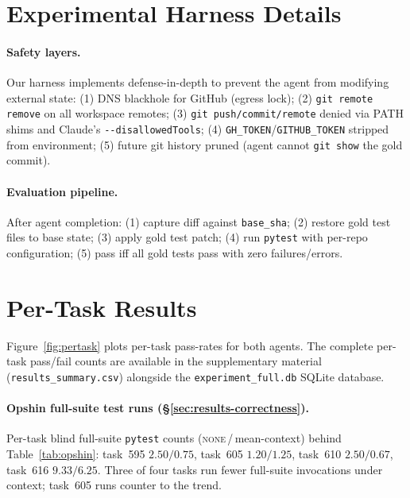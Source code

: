 \documentclass[11pt]{article}
\newcommand{\none}{\textsc{none}}
\begin{document}


\appendix
\section{Experimental Harness Details}
\label{app:harness}

\paragraph{Safety layers.}
Our harness implements defense-in-depth to prevent the agent from modifying external state:
(1) DNS blackhole for GitHub (egress lock);
(2) \texttt{git remote remove} on all workspace remotes;
(3) \texttt{git push/commit/remote} denied via PATH shims and Claude's \texttt{-{}-disallowedTools};
(4) \texttt{GH\_TOKEN}/\texttt{GITHUB\_TOKEN} stripped from environment;
(5) future git history pruned (agent cannot \texttt{git show} the gold commit).

\paragraph{Evaluation pipeline.}
After agent completion: (1) capture diff against \texttt{base\_sha};
(2) restore gold test files to base state;
(3) apply gold test patch;
(4) run \texttt{pytest} with per-repo configuration;
(5) pass iff all gold tests pass with zero failures/errors.

\section{Per-Task Results}
\label{app:pertask}

Figure~\ref{fig:pertask} plots per-task pass-rates for both agents. The complete per-task pass/fail counts are available in the supplementary material (\texttt{results\_summary.csv}) alongside the \texttt{experiment\_full.db} SQLite database.

\paragraph{Opshin full-suite test runs (\S\ref{sec:results-correctness}).}
Per-task blind full-suite \texttt{pytest} counts (\none{}\,/\,mean-context) behind Table~\ref{tab:opshin}: task~595 $2.50/0.75$, task~605 $1.20/1.25$, task~610 $2.50/0.67$, task~616 $9.33/6.25$. Three of four tasks run fewer full-suite invocations under context; task~605 runs counter to the trend.
\end{document}
